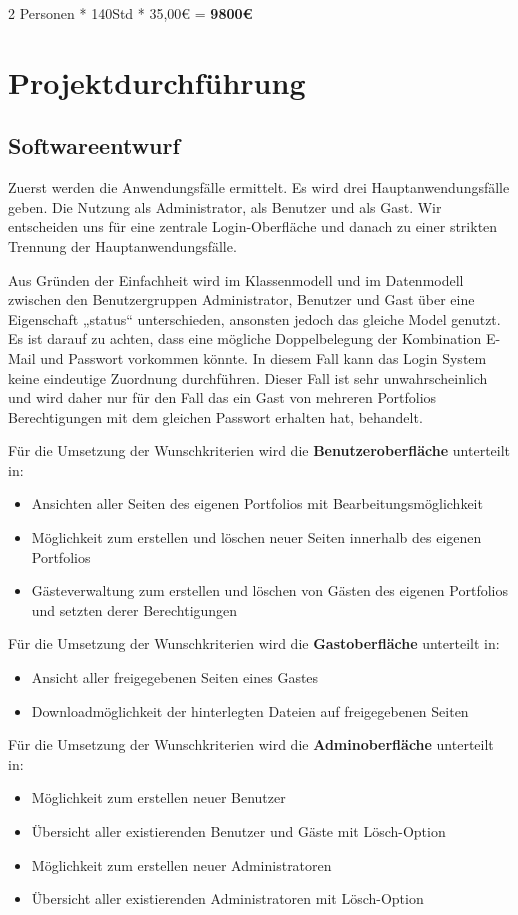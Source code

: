 \documentclass[10.5pt]{scrarticle}
\begin{document}
2 Personen * 140Std * 35,00\euro{} 				= \textbf{9800\euro{}}

\section{Projektdurchführung}
\subsection{Softwareentwurf}

Zuerst werden die Anwendungsfälle ermittelt. Es wird drei Hauptanwendungsfälle geben. Die Nutzung als Administrator, als Benutzer und als Gast. Wir entscheiden uns für eine zentrale Login-Oberfläche und danach zu einer strikten Trennung der Hauptanwendungsfälle.

Aus Gründen der Einfachheit wird im Klassenmodell und im Datenmodell zwischen den Benutzergruppen Administrator, Benutzer und Gast über eine Eigenschaft „status“ unterschieden, ansonsten jedoch das gleiche Model genutzt. 
Es ist darauf zu achten, dass eine mögliche Doppelbelegung der Kombination E-Mail und Passwort vorkommen könnte. In diesem Fall kann das Login System keine eindeutige Zuordnung durchführen. 
Dieser Fall ist sehr unwahrscheinlich und wird daher nur für den Fall das ein Gast von mehreren Portfolios Berechtigungen mit dem gleichen Passwort erhalten hat, behandelt.

Für die Umsetzung der Wunschkriterien wird die \textbf{Benutzeroberfläche} unterteilt in:
\begin{itemize}
	\item Ansichten aller Seiten des eigenen Portfolios mit Bearbeitungsmöglichkeit
	\item  Möglichkeit zum erstellen und löschen neuer Seiten innerhalb des eigenen Portfolios
	\item  Gästeverwaltung zum erstellen und löschen von Gästen des eigenen Portfolios und setzten derer Berechtigungen    \end{itemize}
	
Für die Umsetzung der Wunschkriterien wird die \textbf{Gastoberfläche} unterteilt in:
\begin{itemize}
	\item Ansicht aller freigegebenen Seiten eines Gastes
	\item Downloadmöglichkeit der hinterlegten Dateien auf freigegebenen Seiten
\end{itemize}

Für die Umsetzung der Wunschkriterien wird die \textbf{Adminoberfläche} unterteilt in:
\begin{itemize}
	\item Möglichkeit zum erstellen neuer Benutzer
	\item Übersicht aller existierenden Benutzer und Gäste mit Lösch-Option
	\item Möglichkeit zum erstellen neuer Administratoren
	\item Übersicht aller existierenden Administratoren mit Lösch-Option
\end{itemize}
\end{document}
